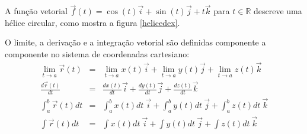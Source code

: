\begin{ex}\label{cap_curvas:exemplo_helice}
A função vetorial $\vec{f}(t)=\cos(t)\vec{i}+\sin(t)\vec{j}+t\vec{k}$ para $ t \in\mathbb{R}$ descreve uma hélice circular, como mostra a figura \ref{helicedex}.
\end{ex}

O limite, a derivação e a integração vetorial são definidas componente a componente no sistema de coordenadas cartesiano:
\begin{eqnarray}
\lim_{t\to a}\vec{r}(t)&=&\lim_{t\to a}x(t) \vec{i}+\lim_{t\to a}y(t)\vec{j}+\lim_{t\to a}z(t)\vec{k}\label{deflim}\\
\frac{d\vec{r}(t)}{dt}&=&\frac{d x(t)}{dt}\vec{i}+\frac{d y(t)}{dt}\vec{j}+\frac{d z(t)}{dt}\vec{k}\label{defder}\\
\int_{a}^b\vec{r}(t){dt}&=&\int_{a}^bx(t)dt~\!\vec{i}+\int_{a}^by(t)dt~\!\vec{j}+\int_{a}^bz(t)dt~\!\vec{k}\label{defint}\\
\int\vec{r}(t){dt}&=&\int x(t)dt~\!\vec{i}+\int y(t)dt~\!\vec{j}+\int z(t)dt~\!\vec{k}\label{defint2}
\end{eqnarray}

